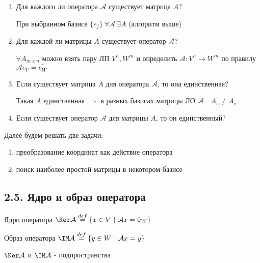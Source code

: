 \documentclass[12pt]{article}
\begin{document}
    \begin{enumerate}
        \item Для каждого ли оператора $\mathcal{A}$ существует матрица $A$?

        При выбранном базисе $\{e_j\} \ \forall \mathcal{A} \ \exists A$ (алгоритм выше)

        \item Для каждой ли матрицы $A$ существует оператор $\mathcal{A}$?

        $\forall A_{m\times n}$ можно взять пару ЛП $V^n, W^m$ и определить $\mathcal{A} : V^n \rightarrow W^m$ по правилу $\mathcal{A}e_V = e^\prime_W$

        \item Если существует матрица $A$ для оператора $\mathcal{A}$, то она единственная?

        Такая $A$ единственная $\Longrightarrow$ в разных базисах матрицы ЛО $\mathcal{A} \quad A_e \neq A_{e^\prime}$

        \item Если существует оператор $\mathcal{A}$ для матрицы $A$, то он единственный?

        \Lab
    \end{enumerate}

    \Nota Далее будем решать две задачи:

    \begin{enumerate}
        \item преобразование координат как действие оператора

        \item поиск наиболее простой матрицы в некотором базисе
    \end{enumerate}

    \subsection[p2\_5]{2.5. Ядро и образ оператора}

    \hypertarget{kernalandimageofoperator}{}

    \Defs Ядро оператора $\Ker \mathcal{A} \stackrel{def}{=} \{x \in V \ | \ \mathcal{A}x = \texttt{0}_W\}$

    \Defs Образ оператора $\IM \mathcal{A} \stackrel{def}{=} \{y \in W \ | \ \mathcal{A}x = y\}$

    \Notas $\Ker \mathcal{A}$ и $\IM \mathcal{A}$ - подпространства
\end{document}
